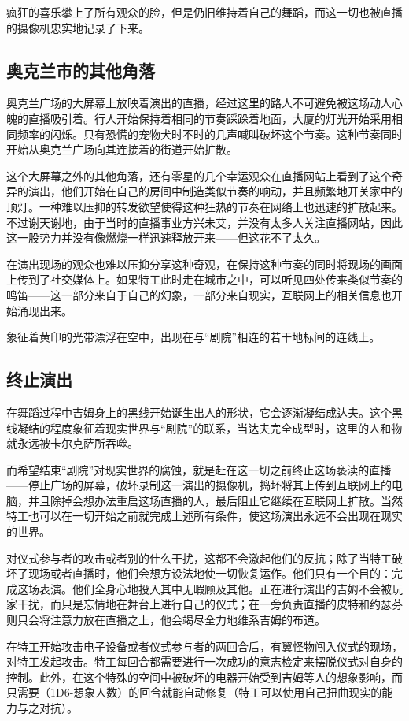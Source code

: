 疯狂的喜乐攀上了所有观众的脸，但是仍旧维持着自己的舞蹈，而这一切也被直播的摄像机忠实地记录了下来。


\subsection{奥克兰市的其他角落}

奥克兰广场的大屏幕上放映着演出的直播，经过这里的路人不可避免被这场动人心魄的直播吸引着。行人开始保持着相同的节奏踩跺着地面，大厦的灯光开始采用相同频率的闪烁。只有恐慌的宠物犬时不时的几声喊叫破坏这个节奏。这种节奏同时开始从奥克兰广场向其连接着的街道开始扩散。

这个大屏幕之外的其他角落，还有零星的几个幸运观众在直播网站上看到了这个奇异的演出，他们开始在自己的房间中制造类似节奏的响动，并且频繁地开关家中的顶灯。一种难以压抑的转发欲望使得这种狂热的节奏在网络上也迅速的扩散起来。不过谢天谢地，由于当时的直播事业方兴未艾，并没有太多人关注直播网站，因此这一股势力并没有像燃烧一样迅速释放开来——但这花不了太久。

在演出现场的观众也难以压抑分享这种奇观，在保持这种节奏的同时将现场的画面上传到了社交媒体上。如果特工此时走在城市之中，可以听见四处传来类似节奏的鸣笛——这一部分来自于自己的幻象，一部分来自现实，互联网上的相关信息也开始涌现出来。

象征着黄印的光带漂浮在空中，出现在与“剧院”相连的若干地标间的连线上。

\subsection{终止演出}

在舞蹈过程中吉姆身上的黑线开始诞生出人的形状，它会逐渐凝结成达夫。这个黑线凝结的程度象征着现实世界与“剧院”的联系，当达夫完全成型时，这里的人和物就永远被卡尔克萨所吞噬。

而希望结束“剧院”对现实世界的腐蚀，就是赶在这一切之前终止这场亵渎的直播——停止广场的屏幕，破坏录制这一演出的摄像机，捣坏将其上传到互联网上的电脑，并且除掉会想办法重启这场直播的人，最后阻止它继续在互联网上扩散。当然特工也可以在一切开始之前就完成上述所有条件，使这场演出永远不会出现在现实的世界。

对仪式参与者的攻击或者别的什么干扰，这都不会激起他们的反抗；除了当特工破坏了现场或者直播时，他们会想方设法地使一切恢复运作。他们只有一个目的：完成这场表演。他们全身心地投入其中无暇顾及其他。正在进行演出的吉姆不会被玩家干扰，而只是忘情地在舞台上进行自己的仪式；在一旁负责直播的皮特和约瑟芬则只会将注意力放在直播之上，他会竭尽全力地维系吉姆的布道。

在特工开始攻击电子设备或者仪式参与者的两回合后，有翼怪物闯入仪式的现场，对特工发起攻击。特工每回合都需要进行一次成功的意志检定来摆脱仪式对自身的控制。此外，在这个特殊的空间中被破坏的电器开始受到吉姆等人的想象影响，而只需要（1D6-想象人数）的回合就能自动修复（特工可以使用自己扭曲现实的能力与之对抗）。

